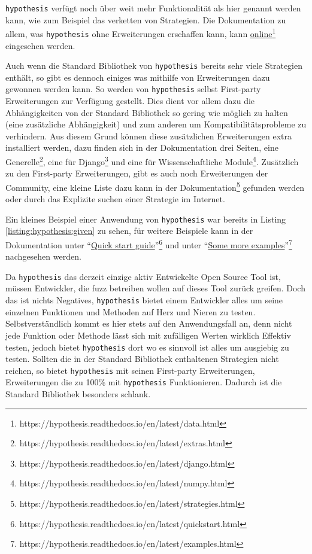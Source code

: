 \lstinline{hypothesis} verfügt noch über weit mehr Funktionalität als hier genannt werden kann,
wie zum Beispiel das verketten von Strategien. Die Dokumentation zu allem, was
\lstinline{hypothesis} ohne Erweiterungen erschaffen kann, kann
\href{https://hypothesis.readthedocs.io/en/latest/data.html}{online}\footnote{https://hypothesis.readthedocs.io/en/latest/data.html}
eingesehen werden.

Auch wenn die Standard Bibliothek von \lstinline{hypothesis} bereits sehr viele Strategien enthält,
so gibt es dennoch einiges was mithilfe von Erweiterungen dazu gewonnen werden kann. So werden
von \lstinline{hypothesis} selbst First-party Erweiterungen zur Verfügung gestellt. Dies dient
vor allem dazu die Abhängigkeiten von der Standard Bibliothek so gering wie möglich zu halten
(eine zusätzliche Abhängigkeit) und zum anderen um Kompatibilitätsprobleme zu verhindern. Aus
diesem Grund können diese zusätzlichen Erweiterungen extra installiert werden, dazu finden sich
in der Dokumentation drei Seiten, eine Generelle\footnote{https://hypothesis.readthedocs.io/en/latest/extras.html},
eine für Django\footnote{https://hypothesis.readthedocs.io/en/latest/django.html} und eine für
Wissenschaftliche Module\footnote{https://hypothesis.readthedocs.io/en/latest/numpy.html}.
Zusätzlich zu den First-party Erweiterungen, gibt es auch noch Erweiterungen der Community,
eine kleine Liste dazu kann in der 
Dokumentation\footnote{https://hypothesis.readthedocs.io/en/latest/strategies.html}
gefunden werden oder durch das Explizite suchen einer Strategie im Internet.

Ein kleines Beispiel einer Anwendung von \lstinline{hypothesis} war bereits in 
Listing \ref{listing:hypothesis:given} zu sehen, für weitere Beispiele kann in 
der Dokumentation unter
"`\href{https://hypothesis.readthedocs.io/en/latest/quickstart.html}{Quick
start
guide}"'\footnote{https://hypothesis.readthedocs.io/en/latest/quickstart.html}
und unter
"`\href{https://hypothesis.readthedocs.io/en/latest/examples.html}{Some more
examples}"'\footnote{https://hypothesis.readthedocs.io/en/latest/examples.html}
nachgesehen werden.

Da \lstinline{hypothesis} das derzeit einzige aktiv Entwickelte Open Source Tool ist, müssen
Entwickler, die \gls{fuzz} betreiben wollen auf dieses Tool zurück greifen. 
Doch das
ist nichts Negatives, \lstinline{hypothesis} bietet einem Entwickler alles um seine einzelnen
Funktionen und Methoden auf Herz und Nieren zu testen. Selbstverständlich kommt es hier stets
auf den Anwendungsfall an, denn nicht jede Funktion oder Methode lässt sich mit zufälligen Werten
wirklich Effektiv testen, jedoch bietet \lstinline{hypothesis} dort wo es sinnvoll ist alles
um ausgiebig zu testen. Sollten die in der Standard Bibliothek enthaltenen Strategien nicht
reichen, so bietet \lstinline{hypothesis} mit seinen First-party Erweiterungen, Erweiterungen die
zu 100\% mit \lstinline{hypothesis} Funktionieren. Dadurch ist die Standard Bibliothek besonders
schlank.

